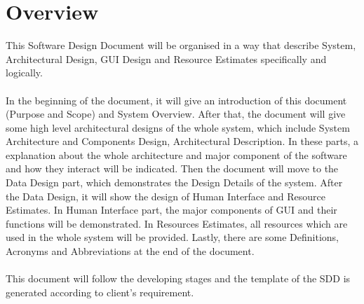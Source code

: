 \documentclass[11pt, a4paper]{report}
\begin{document}
\section{Overview}
This Software Design Document will be organised in a way that describe System, Architectural Design, GUI Design and Resource Estimates specifically and logically. \\ \\
In the beginning of the document, it will give an introduction of this document (Purpose and Scope) and System Overview. After that, the document will give some high level architectural designs of the whole system, which include System Architecture and Components Design, Architectural Description. In these parts, a explanation about the whole architecture and major component of the software and how they interact will be indicated.  Then the document will move to the Data Design part, which demonstrates the Design Details of the system. After the Data Design, it will show the design of Human Interface and Resource Estimates. In Human Interface part, the major components of GUI and their functions  will be demonstrated. In Resources Estimates, all resources which are used in the whole system will be provided. Lastly, there are some Definitions, Acronyms and Abbreviations at the end of the document. \\ \\
This document will follow the developing stages and the template of the SDD is generated according to client's requirement.
\end{document}
